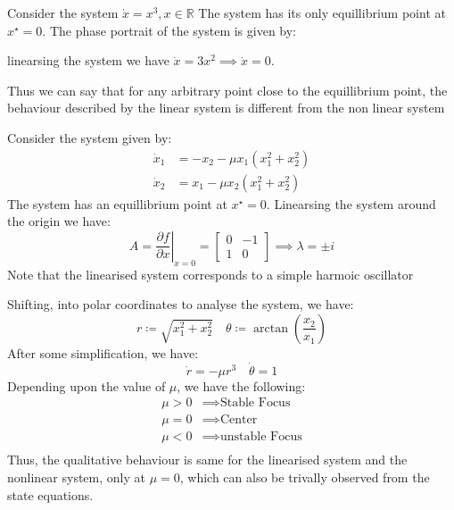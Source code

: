 \begin{example}
    Consider the system \(\dot{x} = x^3 , x\in\mathbb{R} \)
    The system has its only equillibrium point at \(x^{\star} =0\). The phase portrait of the system
    is given by:
    \begin{center}
    \end{center}
    linearsing the system we have \(\dot{x} = 3x^2 \implies \dot{x} = 0 \).
    
    Thus we can say that for any arbitrary point close to the equillibrium point, the behaviour
    described by the linear system is different from the non linear system
\end{example} 
\begin{example}
    Consider the system given by:
    \[
        \begin{aligned}
            \dot{x}_1 &= -x_2 -\mu x_1 (x_1^2 + x_2^2)\\
            \dot{x}_2 &= x_1 - \mu x_2 (x_1^2 + x_2^2)
        \end{aligned}
    \]
    The system has an equillibrium point at \(x^{\star} = 0\).
    Linearsing the system around the origin we have:
    \[
        A = \left . \frac{\partial f}{\partial x} \right |_{x=0} = \begin{bmatrix}
            0 & -1 \\
            1 & 0
        \end{bmatrix} \implies \lambda = \pm i
    \]
    Note that the linearised system corresponds to a simple harmoic oscillator
    
    Shifting, into polar coordinates to analyse the system, we have:
    \[
        r\coloneqq \sqrt{x_1^2 + x_2^2} \quad \theta \coloneqq \arctan \left( \frac{x_2}{x_1} \right)
    \]
    After some simplification, we have:
    \[
        \dot{r} = -\mu r^3 \quad \dot{\theta} = 1 
    \]
    Depending upon the value of \(\mu\), we have the following:
    \[
        \begin{aligned}
            \mu > 0 &\implies \text{Stable Focus} \\
            \mu = 0 &\implies \text{Center} \\
            \mu < 0 &\implies \text{unstable Focus} \\
        \end{aligned}  
    \]
    Thus, the qualitative behaviour is same for the linearised system and the nonlinear system,
    only at \(\mu = 0\), which can also be trivally observed from the state equations.
\end{example}
